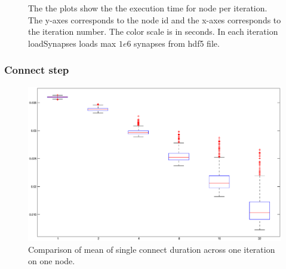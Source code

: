 \begin{figure}[ht!]
\begin{center}
{        }
    \end{center}
    \caption{%
        The the plots show the the execution time for node per iteration.
        The y-axes corresponds to the node id and the x-axes corresponds to the iteration number.
        The color scale is in seconds.
        In each iteration loadSynapses loads max $1e6$ synapses from hdf5 file.
     }%
   \label{fig:implV03}
\end{figure}


\subsubsection{Connect step}

\begin{figure}[ht!]
\centering
\includegraphics[scale=0.5]{pictures/boxplot_new_con_dt_1_300.eps}
\caption{Comparison of mean of single connect duration across one iteration on one node.}
\label{boxplotnewcon}
\end{figure}

